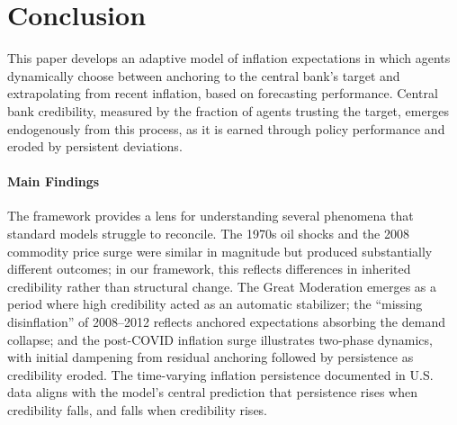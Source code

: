 \documentclass[10pt]{article}
\begin{document}



\section{Conclusion}

This paper develops an adaptive model of inflation expectations in which agents dynamically choose between anchoring to the central bank's target and extrapolating from recent inflation, based on forecasting performance. Central bank credibility, measured by the fraction of agents trusting the target, emerges endogenously from this process, as it is earned through policy performance and eroded by persistent deviations.

\paragraph{Main Findings} The framework provides a lens for understanding several phenomena that standard models struggle to reconcile. The 1970s oil shocks and the 2008 commodity price surge were similar in magnitude but produced substantially different outcomes; in our framework, this reflects differences in inherited credibility rather than structural change. The Great Moderation emerges as a period where high credibility acted as an automatic stabilizer; the ``missing disinflation'' of 2008--2012 reflects anchored expectations absorbing the demand collapse; and the post-COVID inflation surge illustrates two-phase dynamics, with initial dampening from residual anchoring followed by persistence as credibility eroded. The time-varying inflation persistence documented in U.S. data aligns with the model's central prediction that persistence rises when credibility falls, and falls when credibility rises.
\end{document}
